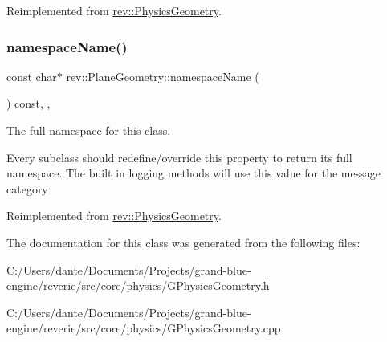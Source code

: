 Reimplemented from \mbox{\hyperlink{classrev_1_1_physics_geometry_afc74d4c03367f3bc83595acaeca7d9a8}{rev\+::\+Physics\+Geometry}}.

\mbox{\label{classrev_1_1_plane_geometry_aafaa3b1c3f1e103cf4aa2d9a2ce9feb1}} 
\subsubsection{\texorpdfstring{namespaceName()}{namespaceName()}}
{\footnotesize\ttfamily const char$\ast$ rev\+::\+Plane\+Geometry\+::namespace\+Name (\begin{DoxyParamCaption}{ }\end{DoxyParamCaption}) const\hspace{0.3cm}{\ttfamily [inline]}, {\ttfamily [override]}, {\ttfamily [virtual]}}



The full namespace for this class. 

Every subclass should redefine/override this property to return its full namespace. The built in logging methods will use this value for the message category 

Reimplemented from \mbox{\hyperlink{classrev_1_1_physics_geometry_ad4311205e1a6eabeeb7773a01d11add5}{rev\+::\+Physics\+Geometry}}.



The documentation for this class was generated from the following files\+:\begin{DoxyCompactItemize}
\item 
C\+:/\+Users/dante/\+Documents/\+Projects/grand-\/blue-\/engine/reverie/src/core/physics/G\+Physics\+Geometry.\+h\item 
C\+:/\+Users/dante/\+Documents/\+Projects/grand-\/blue-\/engine/reverie/src/core/physics/G\+Physics\+Geometry.\+cpp\end{DoxyCompactItemize}
